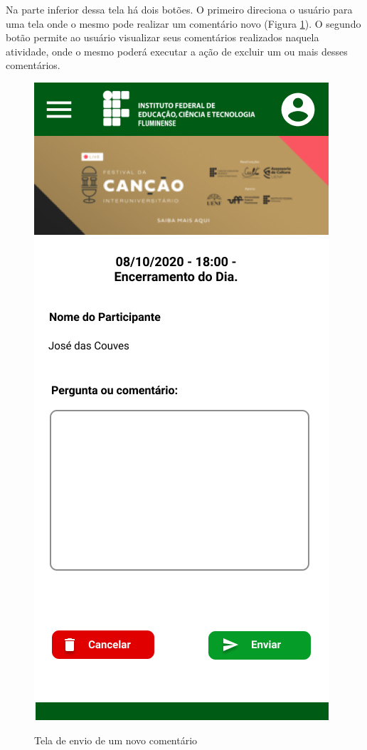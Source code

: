 Na parte inferior dessa tela há dois botões. O primeiro direciona o usuário para uma tela onde o mesmo pode realizar um comentário novo (Figura \ref{fig:audiencia13}). O segundo botão permite ao usuário visualizar seus comentários realizados naquela atividade, onde o mesmo poderá executar a ação de excluir um ou mais desses comentários.

\begin{figure}[H]
    \centering
    \caption{Tela de envio de um novo comentário}
    \includegraphics[scale=0.44]{figuras/Audiencia/13-EnvioComentario.jpg}
    \label{fig:audiencia13}
\end{figure}

